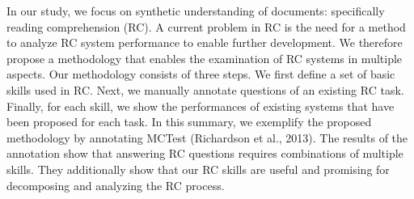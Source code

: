 In our study, we focus on synthetic understanding of documents: specifically reading comprehension (RC). A current problem in RC is the need for a method to analyze RC system performance to enable further development. We therefore propose a methodology that enables the examination of RC systems in multiple aspects. Our methodology consists of three steps. We first define a set of basic skills used in RC. Next, we manually annotate questions of an existing RC task. Finally, for each skill, we show the performances of existing systems that have been proposed for each task. In this summary, we exemplify the proposed methodology by annotating MCTest (Richardson et al., 2013). The results of the annotation show that answering RC questions requires combinations of multiple skills. They additionally show that our RC skills are useful and promising for decomposing and analyzing the RC process.
